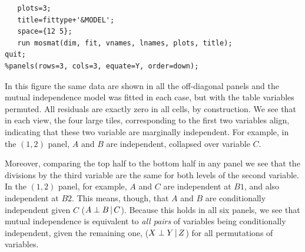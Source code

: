 \begin{verbatim}
   plots=3;
   title=fittype+'&MODEL';
   space={12 5};
   run mosmat(dim, fit, vnames, lnames, plots, title);
quit;
%panels(rows=3, cols=3, equate=Y, order=down);
\end{verbatim}


In this figure the same data are shown in all the off-diagonal panels
and the mutual independence model was fitted in each case, but with the
table variables permuted.  All residuals are exactly zero in all cells,
by construction.
We see that in each view, the four large
tiles, corresponding to the first two variables align, indicating
that these two variable are marginally independent.
For example, in the $(1,2)$ panel, $A$ and $B$ are independent, collapsed
over variable $C$.

Moreover, comparing the top half to the bottom half
in any panel we see that the divisions by the third variable
are the same for both levels of the second variable.
In the $(1, 2)$ panel, for example, $A$ and $C$ are independent at
$B1$, and also independent at  $B2$.
This means, though, that $A$ and $B$ are conditionally independent
given $C$ ($A \perp B \, | \, C$).
Because this holds in all six panels, we see that mutual independence
is equivalent to \emph{all pairs} of variables being conditionally
independent, given the remaining one,  ($X \perp Y \, | \, Z$) for all
permutations of variables.

